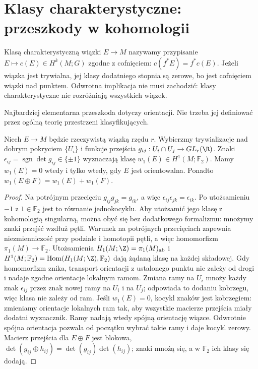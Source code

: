 \section{Klasy charakterystyczne: przeszkody w kohomologii}
\label{sec:klasy-char-16}

\begin{definicja}
Klasą charakterystyczną
wiązki $E\to M$ nazywamy
przypisanie $E\mapsto c(E)
\in H^k(M;G)$ zgodne
z cofnięciem:
$c(f^*E)=f^*c(E)$.
Jeżeli wiązka jest trywialna,
jej klasy dodatniego stopnia
są zerowe, bo jest cofnięciem
wiązki nad punktem.
Odwrotna implikacja
nie musi zachodzić:
klasy charakterystyczne
nie rozróżniają wszystkich
wiązek.
\end{definicja}

Najbardziej elementarna
przeszkoda dotyczy
orientacji. Nie trzeba
jej definiować przez
ogólną teorię przestrzeni
klasyfikujących.

\begin{stwierdzenie}
\label{prop:w1-orientacja-16}
Niech $E\to M$ będzie
rzeczywistą wiązką
rzędu $r$. Wybierzmy
trywializacje nad dobrym
pokryciem $\{U_i\}$ i
funkcje przejścia
$g_{ij}:U_i\cap U_j\to GL_r(\R)$.
Znaki
$\epsilon_{ij}=\operatorname{sgn}
\det g_{ij}\in\{\pm1\}$
wyznaczają klasę
$w_1(E)\in H^1(M;\mathbb F_2)$.
Mamy $w_1(E)=0$
wtedy i tylko wtedy,
gdy $E$ jest orientowalna.
Ponadto
$w_1(E\oplus F)=w_1(E)+w_1(F)$.
\end{stwierdzenie}
\begin{proof}
Na potrójnym przecięciu
$g_{ij}g_{jk}=g_{ik}$,
a więc
$\epsilon_{ij}\epsilon_{jk}
=\epsilon_{ik}$.
Po utożsamieniu $-1$
z $1\in\mathbb F_2$
jest to równanie jednokocyklu. Aby utożsamić jego
klasę z kohomologią singularną, można obyć się
bez dodatkowego formalizmu: mnożymy znaki przejść
wzdłuż pętli. Warunek na potrójnych przecięciach
zapewnia niezmienniczość przy podziale i homotopii
pętli, a więc homomorfizm $\pi_1(M)\to\mathbb F_2$.
Utożsamienia $H_1(M;\Z)=\pi_1(M)_{\mathrm{ab}}$
i $H^1(M;\mathbb F_2)=\operatorname{Hom}(H_1(M;\Z),\mathbb F_2)$
dają żądaną klasę na każdej składowej. Gdy homomorfizm
znika, transport orientacji z ustalonego punktu nie
zależy od drogi i nadaje zgodne orientacje lokalnym ramom.
Zmiana
ramy na $U_i$ mnoży
każdy znak $\epsilon_{ij}$
przez znak nowej ramy
na $U_i$ i na $U_j$;
odpowiada to dodaniu
kobrzegu, więc klasa
nie zależy od ram.
Jeśli $w_1(E)=0$,
kocykl znaków jest
kobrzegiem: zmieniamy
orientacje lokalnych
ram tak, aby wszystkie
macierze przejścia
miały dodatni wyznacznik.
Ramy nadają wtedy
spójną orientację
wiązce. Odwrotnie
spójna orientacja
pozwala od początku
wybrać takie ramy
i daje kocykl zerowy.
Macierz przejścia
dla $E\oplus F$
jest blokowa,
$\det(g_{ij}\oplus h_{ij})
=\det(g_{ij})\det(h_{ij})$;
znaki mnożą się, a
w $\mathbb F_2$
ich klasy się dodają.
\end{proof}

